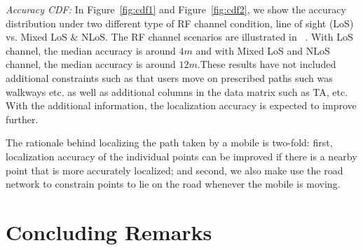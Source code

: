 \documentclass[conference, 10pt]{IEEEtran}
\begin{document}
{\em Accuracy CDF:} In Figure~\ref{fig:cdf1} and Figure~\ref{fig:cdf2}, we show the
accuracy distribution under two different type of RF channel condition, line of sight (LoS) vs. Mixed LoS & NLoS. The RF channel scenarios are illustrated in
~\cite{3gpp38901}. With LoS channel, the median accuracy is around
$4m$ and with Mixed LoS and NLoS channel, the median accuracy is around $12m$.These results have not included additional constraints such as that users move on prescribed paths such was walkways etc. as well as additional columns in the data matrix such as TA, etc. 
With the additional information, the localization accuracy is expected to improve further.

The rationale behind localizing the path taken by a mobile is two-fold: first,
localization accuracy of the individual points can be improved if there is a
nearby point that is more accurately localized; and second, we also make use the
road network to constrain points to lie on the road whenever the mobile is
moving. 



\section{Concluding Remarks}
\label{sec:concl}





%
%    

{%


}
\end{document}
